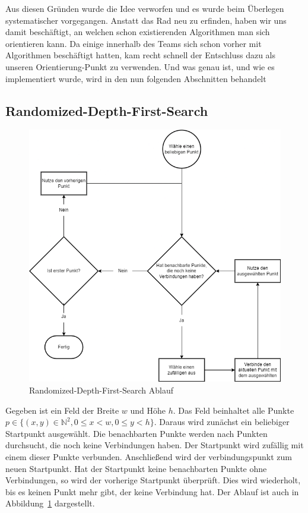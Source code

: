 Aus diesen Gründen wurde die Idee verworfen und es wurde beim Überlegen systematischer vorgegangen. Anstatt das Rad neu zu erfinden, haben wir uns damit beschäftigt, an welchen schon existierenden Algorithmen man sich orientieren kann. 
Da einige innerhalb des Teams sich schon vorher mit Algorithmen beschäftigt hatten, kam recht schnell der Entschluss dazu  als unseren Orientierung-Punkt zu verwenden. 
Und was  genau ist, und wie es implementiert wurde, wird in den nun folgenden Abschnitten behandelt



\subsection{Randomized-Depth-First-Search}\label{subsec:randomized-depth-first-search}
    \begin{figure}[ht!]
        \centering
        \includegraphics[width=\paperwidth/2]{../assets/img/Randomised-Depth-First-Search}
        \caption{Randomized-Depth-First-Search Ablauf}
        \label{fig:randomized-depth-first-search-flow}
    \end{figure}
    Gegeben ist ein Feld der Breite $w$ und Höhe $h$.
    Das Feld beinhaltet alle Punkte $p\in\{(x,y)\in\mathbb{N}^2, 0\leq x<w, 0\leq y<h\}$.
    Daraus wird zunächst ein beliebiger Startpunkt ausgewählt.
    Die benachbarten Punkte werden nach Punkten durchsucht, die noch keine Verbindungen haben.
    Der Startpunkt wird zufällig mit einem dieser Punkte verbunden.
    Anschließend wird der verbindungspunkt zum neuen Startpunkt.
    Hat der Startpunkt keine benachbarten Punkte ohne Verbindungen, so wird der vorherige Startpunkt überprüft.
    Dies wird wiederholt, bis es keinen Punkt mehr gibt, der keine Verbindung hat.
    Der Ablauf ist auch in Abbildung~\ref{fig:randomized-depth-first-search-flow} dargestellt.

